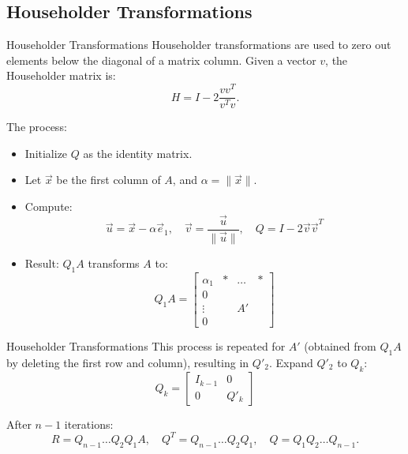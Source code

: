 \documentclass{beamer}
\numberwithin{equation}{section}
\begin{document}
\subsection{Householder Transformations}
\begin{frame}{Householder Transformations}
Householder transformations are used to zero out elements below the diagonal of a matrix column. Given a vector \( v \), the Householder matrix is:
\[
H = I - 2 \dfrac{vv^T}{v^T v}.
\]

The process:
\begin{itemize}
    \item Initialize \( Q \) as the identity matrix.
    \item Let \( \vec{x} \) be the first column of \( A \), and \( \alpha = \|\vec{x}\| \).
    \item Compute:
    \[
    \vec{u} = \vec{x} - \alpha \vec{e}_1, \quad \vec{v} = \dfrac{\vec{u}}{\|\vec{u}\|}, \quad Q = I - 2 \vec{v}\vec{v}^T
    \]
    \item Result: \( Q_1 A \) transforms \( A \) to:
    \[
    Q_1 A = 
    \begin{bmatrix}
    \alpha_1 & * & \dots & * \\
    0 & & & \\
    \vdots & & A' & \\
    0 & & &
    \end{bmatrix}
    \]
\end{itemize}
\end{frame}

\begin{frame}{Householder Transformations}
This process is repeated for \( A' \) (obtained from \( Q_1 A \) by deleting the first row and column), resulting in \( Q'_2 \). Expand \( Q'_2 \) to \( Q_k \):
\[
Q_k = \begin{bmatrix} I_{k-1} & 0 \\ 0 & Q'_k \end{bmatrix}
\]

After \( n-1 \) iterations:
\[
R = Q_{n-1} \dots Q_2Q_1A, \quad Q^T = Q_{n-1} \dots Q_2Q_1, \quad Q = Q_1Q_2 \dots Q_{n-1}.
\]
\end{frame}
\end{document}
